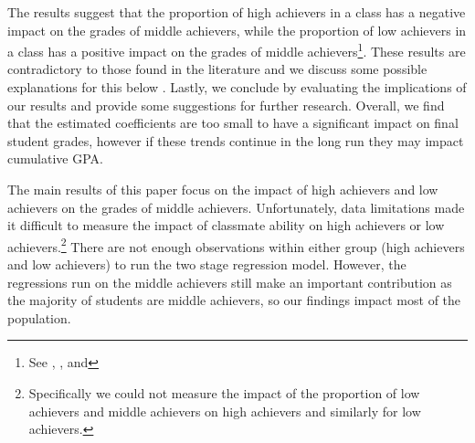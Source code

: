 The results suggest that the proportion of high achievers in a class has a negative impact on the grades of middle achievers, while the proportion of low achievers in a class has a positive impact on the grades of middle achievers\footnote{See , , and }.
These results are contradictory to those found in the literature and we discuss some possible explanations for this below \citep{kang2007classroom,carman2012classroom,burke2013classroom,schlosser2008inside,lavy2012good}. 
Lastly, we conclude by evaluating the implications of our results and provide some suggestions for further research. 
Overall, we find that the estimated coefficients are too small to have a significant impact on final student grades, however if these trends continue in the long run they may impact cumulative GPA. 

The main results of this paper focus on the impact of high achievers and low achievers on the grades of middle achievers. 
Unfortunately, data limitations made it difficult to measure the impact of classmate ability on high achievers or low achievers.\footnote{Specifically we could not measure the impact of the proportion of low achievers and middle achievers on high achievers and similarly for low achievers.} 
There are not enough observations within either group (high achievers and low achievers) to run the two stage regression model. 
However, the regressions run on the middle achievers still make an important contribution as the majority of students are middle achievers, so our findings impact most of the population.


